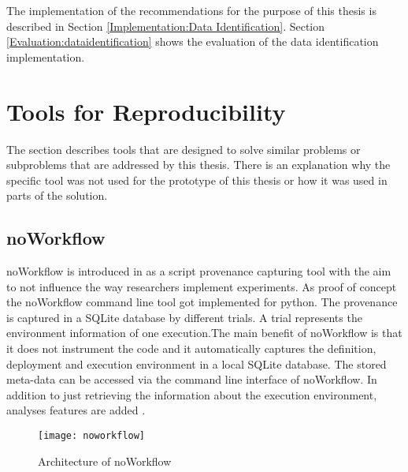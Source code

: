\documentclass[draft,final]{vutinfth} %
\begin{document}
The implementation of the recommendations for the purpose of this thesis is described in Section \ref{Implementation:Data Identification}. Section \ref{Evaluation:dataidentification} shows the evaluation of the data identification implementation. 

\section{Tools for Reproducibility}\label{Existing Tools}
The section describes tools that are designed to solve similar problems or subproblems that are addressed by this thesis. There is an explanation why the specific tool was not used for the prototype of this thesis or how it was used in parts of the solution. 

\subsection{noWorkflow}\label{Noworkflow}
noWorkflow is introduced in \cite{c9e0604becba42af96a9cb0a6f60018b} as a script provenance capturing tool with the aim to not influence the way researchers implement experiments. As proof of concept the noWorkflow command line tool got implemented for python. The provenance is captured in a SQLite database by different trials. A trial represents the environment information of one execution.The main benefit of noWorkflow is that it does not instrument the code and it automatically captures the definition, deployment and execution environment in a local SQLite database. The stored meta-data can be accessed via the command line interface of noWorkflow. In addition to just retrieving the information about the execution environment, analyses features are added \cite{c9e0604becba42af96a9cb0a6f60018b}.

\begin{figure}[h]
	\centering
	\texttt{[image: noworkflow]}
	\caption{Architecture of noWorkflow \cite{c9e0604becba42af96a9cb0a6f60018b}}
	\label{fig:noworkflow} %
\end{figure}
\end{document}

